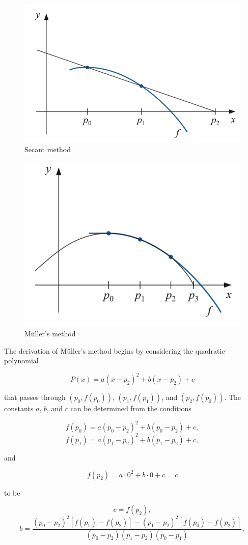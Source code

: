 \documentclass[preprint,12pt]{elsarticle}
\begin{document}
\begin{figure}
\centering\includegraphics[width=0.4\linewidth]{muller2.png}
\caption{Secant method}
\label{fig:muller1}
\end{figure}

\begin{figure}
\centering\includegraphics[width=0.4\linewidth]{muller1.png}
\caption{M\"uller's method}
\label{fig:muller2}
\end{figure}

The derivation of M\"uller's method begins by considering the quadratic polynomial 

\begin{equation}
    P(x)=a(x-p_2)^2+b(x-p_2)+c
\end{equation}

that passes through $(p_0,f(p_0))$, $(p_1,f(p_1))$, and $(p_2,f(p_2))$. The constants $a$, $b$, and $c$ can be determined from the conditions 

\begin{equation}
    f(p_0)=a(p_{0}-p_2)^2+b(p_{0}-p_2)+c,
\end{equation}
\begin{equation}
    f(p_1)=a(p_{1}-p_2)^2+b(p_{1}-p_2)+c,
\end{equation}

and

\begin{equation}
    f(p_2)=a \cdot 0^2+b\cdot 0+c=c
\end{equation}

to be

\begin{equation}
\label{eq:muller_c}
    c=f(p_2),
\end{equation}
\begin{equation}
\label{eq:muller_b}
    b=\frac{(p_{0}-p_2)^2[f(p_1)-f(p_2)]-(p_{1}-p_2)^2[f(p_0)-f(p_2)]}{(p_{0}-p_2)(p_{1}-p_2)(p_{0}-p_1)},
\end{equation}
\end{document}

